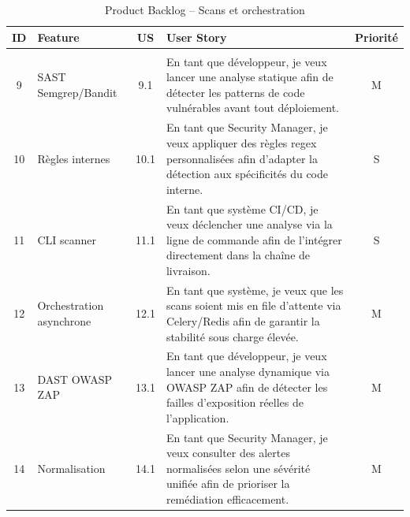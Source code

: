 \begin{table}[H]
\centering
\caption{Product Backlog -- Scans et orchestration}
\label{tab:backlog-scans}
\small
\renewcommand{\arraystretch}{1.2}
\begin{tabularx}{\textwidth}{c X c X c}
\hline
\rowcolor{gray!15}
\textbf{ID} & \textbf{Feature} & \textbf{US} & \textbf{User Story} & \textbf{Priorité} \\
\hline
\rowcolor{gray!10}
\multicolumn{5}{c}{\textbf{Module Scans SAST / DAST et Orchestration}} \\
\hline
9 & SAST Semgrep/Bandit & 9.1
  & En tant que développeur, je veux lancer une analyse statique afin de détecter
    les patterns de code vulnérables avant tout déploiement. & M \\
10 & Règles internes & 10.1
  & En tant que Security Manager, je veux appliquer des règles regex personnalisées
    afin d'adapter la détection aux spécificités du code interne. & S \\
11 & CLI scanner & 11.1
  & En tant que système CI/CD, je veux déclencher une analyse via la ligne de commande
    afin de l'intégrer directement dans la chaîne de livraison. & S \\
12 & Orchestration asynchrone & 12.1
  & En tant que système, je veux que les scans soient mis en file d'attente via
    Celery/Redis afin de garantir la stabilité sous charge élevée. & M \\
13 & DAST OWASP ZAP & 13.1
  & En tant que développeur, je veux lancer une analyse dynamique via OWASP ZAP
    afin de détecter les failles d'exposition réelles de l'application. & M \\
14 & Normalisation & 14.1
  & En tant que Security Manager, je veux consulter des alertes normalisées selon
    une sévérité unifiée afin de prioriser la remédiation efficacement. & M \\
\hline
\end{tabularx}
\end{table}


